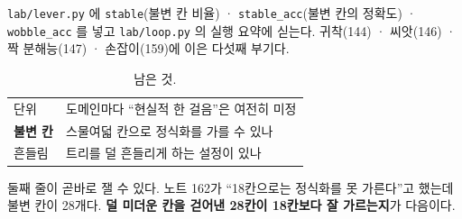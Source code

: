 \documentclass[10pt]{article}
\begin{document}
\texttt{lab/lever.py} 에 \texttt{stable}(불변 칸 비율) ·
\texttt{stable\_acc}(불변 칸의 정확도) · \texttt{wobble\_acc} 를 넣고
\texttt{lab/loop.py} 의 실행 요약에 싣는다. 귀착(144) · 씨앗(146) · 짝
분해능(147) · 손잡이(159)에 이은 다섯째 부기다.


\begin{table}[t]
\centering\tsize
\caption{남은 것.}
\begin{tabular}{ll}
\toprule
단위 & 도메인마다 ``현실적 한 걸음''은 여전히 미정 \\
\textbf{불변 칸} & 스물여덟 칸으로 정식화를 가를 수 있나 \\
흔들림 & 트리를 덜 흔들리게 하는 설정이 있나 \\
\bottomrule
\end{tabular}
\end{table}

둘째 줄이 곧바로 잴 수 있다. 노트 162가 ``18칸으로는 정식화를 못 가른다''고
했는데 불변 칸이 28개다. \textbf{덜 미더운 칸을 걷어낸 28칸이 18칸보다
잘 가르는지}가 다음이다.
\end{document}
